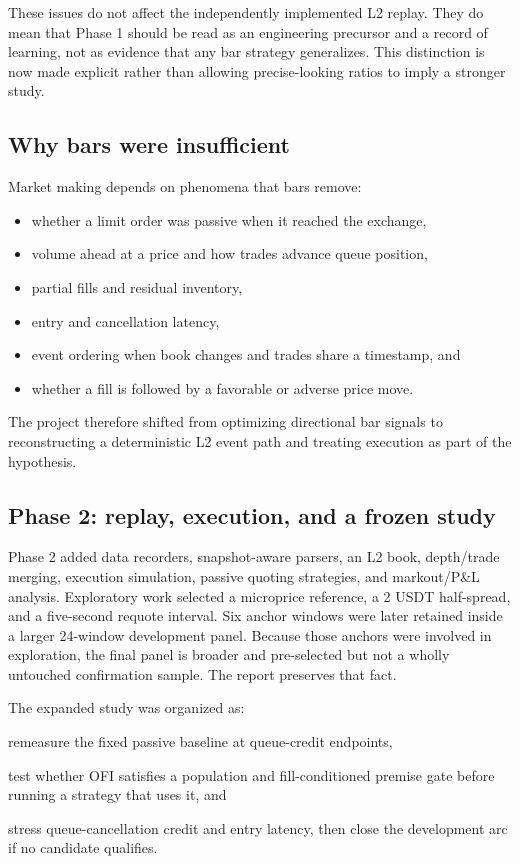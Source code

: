 These issues do not affect the independently implemented L2 replay. They do mean
that Phase 1 should be read as an engineering precursor and a record of learning,
not as evidence that any bar strategy generalizes. This distinction is now made
explicit rather than allowing precise-looking ratios to imply a stronger study.

\subsection{Why bars were insufficient}

Market making depends on phenomena that bars remove:

\begin{itemize}
  \item whether a limit order was passive when it reached the exchange,
  \item volume ahead at a price and how trades advance queue position,
  \item partial fills and residual inventory,
  \item entry and cancellation latency,
  \item event ordering when book changes and trades share a timestamp, and
  \item whether a fill is followed by a favorable or adverse price move.
\end{itemize}

The project therefore shifted from optimizing directional bar signals to
reconstructing a deterministic L2 event path and treating execution as part of
the hypothesis.

\subsection{Phase 2: replay, execution, and a frozen study}

Phase 2 added data recorders, snapshot-aware parsers, an L2 book, depth/trade
merging, execution simulation, passive quoting strategies, and markout/P\&L
analysis. Exploratory work selected a microprice reference, a 2 USDT
half-spread, and a five-second requote interval. Six anchor windows were later
retained inside a larger 24-window development panel. Because those anchors
were involved in exploration, the final panel is broader and pre-selected but
not a wholly untouched confirmation sample. The report preserves that fact.

The expanded study was organized as:

\begin{description}[leftmargin=5.4em,style=nextline]
  \item[Phase A] remeasure the fixed passive baseline at queue-credit endpoints,
  \item[Phase B] test whether OFI satisfies a population and fill-conditioned
        premise gate before running a strategy that uses it, and
  \item[Phase C] stress queue-cancellation credit and entry latency, then close
        the development arc if no candidate qualifies.
\end{description}

